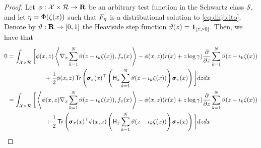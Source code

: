 \begin{proof}
  Let $\phi:\mathcal{X}\times\returnspace\to\R$ be an arbitrary test
  function in the Schwartz class $\mathscr{S}$, and let $\returnmeasure
  = \Phi(\statistics(x))$ such that $\cdf[\returnmeasure]$ is a
  distributional solution to \eqref{eq:dhjb:ito}.
  Denote by $\vartheta:\R\to[0,1]$ the Heaviside step function $\vartheta(z) = \indicator{z>0}$. Then, we have that
  \begin{align*}
    0
    &= \int_{\xxX\times\returnspace}\bigg[\phi(x,
      z)\left\langle\nabla_x\sum_{k=1}^N\vartheta(z -
      \proj{k}\statistics(x)), \xxf(x)\right\rangle - \phi(x, z)(r(x)
      + z\log\gamma)\partialderiv{}{z}\sum_{k=1}^N\vartheta(z -
      \proj{k}\statistics(x))\\
    &\qquad\qquad\qquad + \frac{1}{2}\phi(x,
      z)\trace\left(\quadraticform{\xxs(x)}{\left(\hessian{x}\sum_{k=1}^N\vartheta(z
      -\proj{k}\statistics(x))\right)}\right)\bigg]dzdx\\ 
    &= \int_{\xxX\times\returnspace}\bigg[\left\langle\phi(x,
      z)\nabla_x\sum_{k=1}^N\vartheta(z - \proj{k}\statistics(x)),
      \xxf(x)\right\rangle - \phi(x, z)(r(x) +
      z\log\gamma)\partialderiv{}{z}\sum_{k=1}^N\vartheta(z -
      \proj{k}\statistics(x))\\ 
    &\qquad\qquad\qquad +
      \frac{1}{2}\trace\left(\quadraticform{\xxs(x)}{\phi(x,z)\left(\hessian{x}\sum_{k=1}^N\vartheta(z
      -\proj{k}\statistics(x))\right)}\right)\bigg]dzdx\\ 
  \end{align*}
    

\end{proof}
